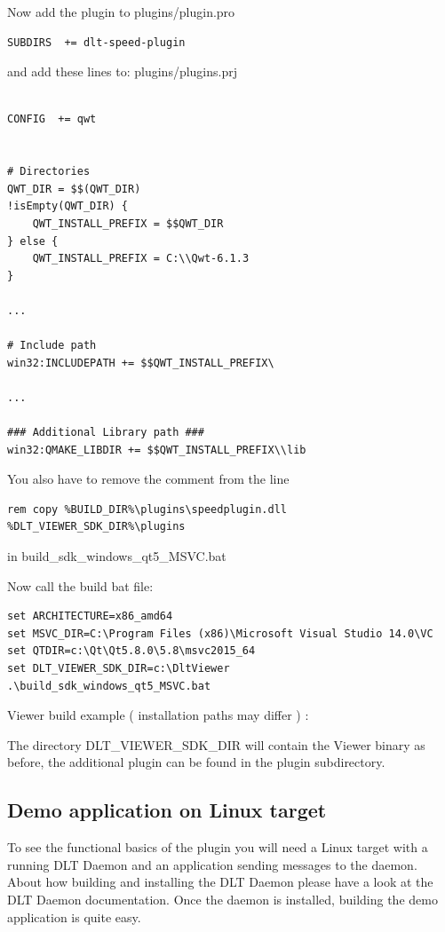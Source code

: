 \documentclass[a4paper,11pt]{article}
\begin{document}
Now add the plugin to plugins/plugin.pro

\begin{verbatim}
SUBDIRS  += dlt-speed-plugin
\end{verbatim}

and add these lines to: plugins/plugins.prj

\begin{verbatim}

CONFIG  += qwt


# Directories
QWT_DIR = $$(QWT_DIR)
!isEmpty(QWT_DIR) {
    QWT_INSTALL_PREFIX = $$QWT_DIR
} else {
    QWT_INSTALL_PREFIX = C:\\Qwt-6.1.3
}

...

# Include path
win32:INCLUDEPATH += $$QWT_INSTALL_PREFIX\

...

### Additional Library path ###
win32:QMAKE_LIBDIR += $$QWT_INSTALL_PREFIX\\lib

\end{verbatim}

You also have to remove the comment from the line
\begin{verbatim}
rem copy %BUILD_DIR%\plugins\speedplugin.dll %DLT_VIEWER_SDK_DIR%\plugins
\end{verbatim}
in build\_sdk\_windows\_qt5\_MSVC.bat

Now call the build bat file:

\begin{verbatim}
set ARCHITECTURE=x86_amd64
set MSVC_DIR=C:\Program Files (x86)\Microsoft Visual Studio 14.0\VC
set QTDIR=c:\Qt\Qt5.8.0\5.8\msvc2015_64
set DLT_VIEWER_SDK_DIR=c:\DltViewer
.\build_sdk_windows_qt5_MSVC.bat
\end{verbatim}


Viewer build example ( installation paths may differ ) :

The directory DLT\_VIEWER\_SDK\_DIR will contain the Viewer binary as before, the additional plugin can be found
in the plugin subdirectory.

\subsection{Demo application on Linux target}
To see the functional basics of the plugin you will need a Linux target with a running DLT Daemon and an application
sending messages to the daemon. About how building and installing the DLT Daemon please have a look at the DLT Daemon documentation.
Once the daemon is installed, building the demo application is quite easy.
\end{document}
